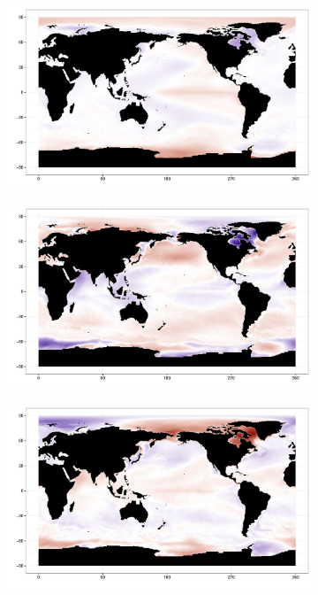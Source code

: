 \begin{figure}[h!bt]
  \centering
  \begin{subfigure}{.3\textwidth}
    \centering
    \includegraphics[width=.9\linewidth]{images/EOF3_0.pdf}
  \end{subfigure}
  \begin{subfigure}{.3\textwidth}
    \centering
    \includegraphics[width=.9\linewidth]{images/EOF6_0.pdf}
  \end{subfigure}
  \begin{subfigure}{.3\textwidth}
    \centering
    \includegraphics[width=.9\linewidth]{images/EOF7_0.pdf}

\end{subfigure}
\end{figure}
